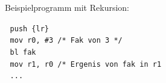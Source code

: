 		\noindent Beispielprogramm mit Rekursion: \\
		\begin{minipage}{0.7\textwidth}
			\textcolor{white}{.} \hspace{0.4cm} \texttt{push \{lr\}} \\
			\textcolor{white}{.} \hspace{0.4cm} \texttt{mov r0, \#3 /* Fak von 3 */} \\
			\textcolor{white}{.} \hspace{0.4cm} \texttt{bl fak} \\
			\textcolor{white}{.} \hspace{0.4cm} \texttt{mov r1, r0 /* Ergenis von fak in r1} \\
			\textcolor{white}{.} \hspace{0.4cm} \texttt{...} \\ \mbox{} \\


\end{minipage}
